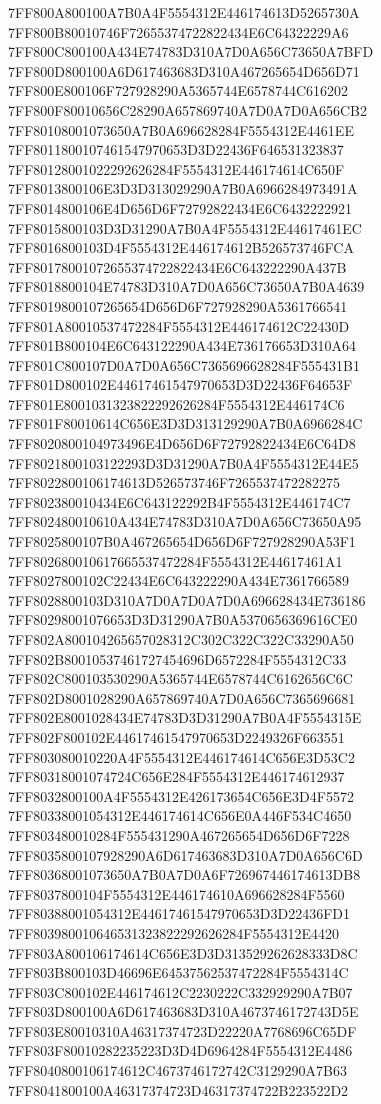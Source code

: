 7FF800A800100A7B0A4F5554312E446174613D5265730A
7FF800B80010746F72655374722822434E6C64322229A6
7FF800C800100A434E74783D310A7D0A656C73650A7BFD
7FF800D800100A6D617463683D310A467265654D656D71
7FF800E800106F727928290A5365744E6578744C616202
7FF800F80010656C28290A657869740A7D0A7D0A656CB2
7FF80108001073650A7B0A696628284F5554312E4461EE
7FF8011800107461547970653D3D22436F646531323837
7FF80128001022292626284F5554312E446174614C650F
7FF8013800106E3D3D313029290A7B0A6966284973491A
7FF8014800106E4D656D6F72792822434E6C6432222921
7FF8015800103D3D31290A7B0A4F5554312E44617461EC
7FF8016800103D4F5554312E446174612B526573746FCA
7FF80178001072655374722822434E6C643222290A437B
7FF8018800104E74783D310A7D0A656C73650A7B0A4639
7FF8019800107265654D656D6F727928290A5361766541
7FF801A80010537472284F5554312E446174612C22430D
7FF801B800104E6C643122290A434E736176653D310A64
7FF801C800107D0A7D0A656C7365696628284F555431B1
7FF801D800102E44617461547970653D3D22436F64653F
7FF801E8001031323822292626284F5554312E446174C6
7FF801F80010614C656E3D3D313129290A7B0A6966284C
7FF8020800104973496E4D656D6F72792822434E6C64D8
7FF8021800103122293D3D31290A7B0A4F5554312E44E5
7FF8022800106174613D526573746F7265537472282275
7FF802380010434E6C643122292B4F5554312E446174C7
7FF802480010610A434E74783D310A7D0A656C73650A95
7FF8025800107B0A467265654D656D6F727928290A53F1
7FF802680010617665537472284F5554312E44617461A1
7FF8027800102C22434E6C643222290A434E7361766589
7FF8028800103D310A7D0A7D0A7D0A696628434E736186
7FF80298001076653D3D31290A7B0A5370656369616CE0
7FF802A800104265657028312C302C322C322C33290A50
7FF802B80010537461727454696D6572284F5554312C33
7FF802C800103530290A5365744E6578744C6162656C6C
7FF802D8001028290A657869740A7D0A656C7365696681
7FF802E8001028434E74783D3D31290A7B0A4F5554315E
7FF802F800102E44617461547970653D2249326F663551
7FF803080010220A4F5554312E446174614C656E3D53C2
7FF80318001074724C656E284F5554312E446174612937
7FF8032800100A4F5554312E426173654C656E3D4F5572
7FF80338001054312E446174614C656E0A446F534C4650
7FF803480010284F555431290A467265654D656D6F7228
7FF8035800107928290A6D617463683D310A7D0A656C6D
7FF80368001073650A7B0A7D0A6F726967446174613DB8
7FF8037800104F5554312E446174610A696628284F5560
7FF80388001054312E44617461547970653D3D22436FD1
7FF803980010646531323822292626284F5554312E4420
7FF803A800106174614C656E3D3D313529262628333D8C
7FF803B800103D46696E64537562537472284F5554314C
7FF803C800102E446174612C2230222C332929290A7B07
7FF803D800100A6D617463683D310A4673746172743D5E
7FF803E80010310A46317374723D22220A7768696C65DF
7FF803F80010282235223D3D4D6964284F5554312E4486
7FF8040800106174612C4673746172742C3129290A7B63
7FF8041800100A46317374723D46317374722B223522D2
